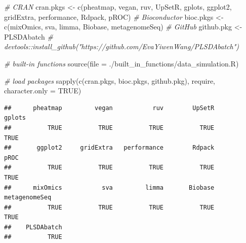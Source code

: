 \documentclass[
]{book}
\newenvironment{Shaded}{\begin{snugshade}}{\end{snugshade}}
\newcommand{\AttributeTok}[1]{\textcolor[rgb]{0.77,0.63,0.00}{#1}}
\newcommand{\CommentTok}[1]{\textcolor[rgb]{0.56,0.35,0.01}{\textit{#1}}}
\newcommand{\ConstantTok}[1]{\textcolor[rgb]{0.00,0.00,0.00}{#1}}
\newcommand{\FunctionTok}[1]{\textcolor[rgb]{0.00,0.00,0.00}{#1}}
\newcommand{\NormalTok}[1]{#1}
\newcommand{\OtherTok}[1]{\textcolor[rgb]{0.56,0.35,0.01}{#1}}
\newcommand{\StringTok}[1]{\textcolor[rgb]{0.31,0.60,0.02}{#1}}
\begin{document}
\begin{Shaded}
\begin{Highlighting}[]
\CommentTok{\# CRAN}
\NormalTok{cran.pkgs }\OtherTok{\textless{}{-}} \FunctionTok{c}\NormalTok{(}\StringTok{\textquotesingle{}pheatmap\textquotesingle{}}\NormalTok{, }\StringTok{\textquotesingle{}vegan\textquotesingle{}}\NormalTok{, }\StringTok{\textquotesingle{}ruv\textquotesingle{}}\NormalTok{, }\StringTok{\textquotesingle{}UpSetR\textquotesingle{}}\NormalTok{, }\StringTok{\textquotesingle{}gplots\textquotesingle{}}\NormalTok{, }
               \StringTok{\textquotesingle{}ggplot2\textquotesingle{}}\NormalTok{, }\StringTok{\textquotesingle{}gridExtra\textquotesingle{}}\NormalTok{, }\StringTok{\textquotesingle{}performance\textquotesingle{}}\NormalTok{, }\StringTok{\textquotesingle{}Rdpack\textquotesingle{}}\NormalTok{, }\StringTok{\textquotesingle{}pROC\textquotesingle{}}\NormalTok{)}
\CommentTok{\# Bioconductor}
\NormalTok{bioc.pkgs }\OtherTok{\textless{}{-}} \FunctionTok{c}\NormalTok{(}\StringTok{\textquotesingle{}mixOmics\textquotesingle{}}\NormalTok{, }\StringTok{\textquotesingle{}sva\textquotesingle{}}\NormalTok{, }\StringTok{\textquotesingle{}limma\textquotesingle{}}\NormalTok{, }\StringTok{\textquotesingle{}Biobase\textquotesingle{}}\NormalTok{, }\StringTok{\textquotesingle{}metagenomeSeq\textquotesingle{}}\NormalTok{)}
\CommentTok{\# GitHub}
\NormalTok{github.pkg }\OtherTok{\textless{}{-}} \StringTok{\textquotesingle{}PLSDAbatch\textquotesingle{}} 
\CommentTok{\# devtools::install\_github("https://github.com/EvaYiwenWang/PLSDAbatch")}

\CommentTok{\# built{-}in functions}
\FunctionTok{source}\NormalTok{(}\AttributeTok{file =} \StringTok{\textquotesingle{}./built\_in\_functions/data\_simulation.R\textquotesingle{}}\NormalTok{)}

\CommentTok{\# load packages }
\FunctionTok{sapply}\NormalTok{(}\FunctionTok{c}\NormalTok{(cran.pkgs, bioc.pkgs, github.pkg), require, }\AttributeTok{character.only =} \ConstantTok{TRUE}\NormalTok{)}
\end{Highlighting}
\end{Shaded}

\begin{verbatim}
##      pheatmap         vegan           ruv        UpSetR        gplots 
##          TRUE          TRUE          TRUE          TRUE          TRUE 
##       ggplot2     gridExtra   performance        Rdpack          pROC 
##          TRUE          TRUE          TRUE          TRUE          TRUE 
##      mixOmics           sva         limma       Biobase metagenomeSeq 
##          TRUE          TRUE          TRUE          TRUE          TRUE 
##    PLSDAbatch 
##          TRUE
\end{verbatim}
\end{document}
